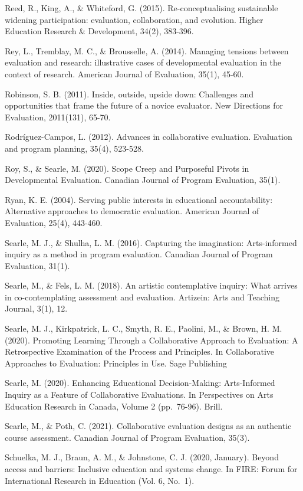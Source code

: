 \documentclass[
]{book}
\begin{document}
Reed, R., King, A., \& Whiteford, G. (2015). Re-conceptualising sustainable widening participation: evaluation, collaboration, and evolution. Higher Education Research \& Development, 34(2), 383-396.

Rey, L., Tremblay, M. C., \& Brousselle, A. (2014). Managing tensions between evaluation and research: illustrative cases of developmental evaluation in the context of research. American Journal of Evaluation, 35(1), 45-60.

Robinson, S. B. (2011). Inside, outside, upside down: Challenges and opportunities that frame the future of a novice evaluator. New Directions for Evaluation, 2011(131), 65-70.

Rodríguez-Campos, L. (2012). Advances in collaborative evaluation. Evaluation and program planning, 35(4), 523-528.

Roy, S., \& Searle, M. (2020). Scope Creep and Purposeful Pivots in Developmental Evaluation. Canadian Journal of Program Evaluation, 35(1).

Ryan, K. E. (2004). Serving public interests in educational accountability: Alternative approaches to democratic evaluation. American Journal of Evaluation, 25(4), 443-460.

Searle, M. J., \& Shulha, L. M. (2016). Capturing the imagination: Arts-informed inquiry as a method in program evaluation. Canadian Journal of Program Evaluation, 31(1).

Searle, M., \& Fels, L. M. (2018). An artistic contemplative inquiry: What arrives in co-contemplating assessment and evaluation. Artizein: Arts and Teaching Journal, 3(1), 12.

Searle, M. J., Kirkpatrick, L. C., Smyth, R. E., Paolini, M., \& Brown, H. M. (2020). Promoting Learning Through a Collaborative Approach to Evaluation: A Retrospective Examination of the Process and Principles. In Collaborative Approaches to Evaluation: Principles in Use. Sage Publishing

Searle, M. (2020). Enhancing Educational Decision-Making: Arts-Informed Inquiry as a Feature of Collaborative Evaluations. In Perspectives on Arts Education Research in Canada, Volume 2 (pp.~76-96). Brill.

Searle, M., \& Poth, C. (2021). Collaborative evaluation designs as an authentic course assessment. Canadian Journal of Program Evaluation, 35(3).

Schuelka, M. J., Braun, A. M., \& Johnstone, C. J. (2020, January). Beyond access and barriers: Inclusive education and systems change. In FIRE: Forum for International Research in Education (Vol. 6, No.~1).
\end{document}
